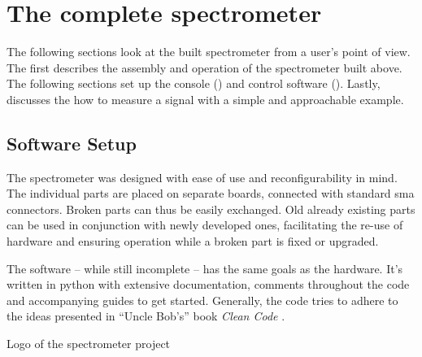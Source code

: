 \chapter{The complete spectrometer}

The following sections look at the built spectrometer from a user's point of view. The first  describes the assembly and operation of the spectrometer built above. The following sections set up the console () and control software (). Lastly,  discusses the how to measure a signal with a simple and approachable example.

\section{Software Setup}
The spectrometer was designed with ease of use and reconfigurability in mind. The individual parts are placed on separate boards, connected with standard \acrshort{sma} connectors. Broken parts can thus be easily exchanged. Old already existing parts can be used in conjunction with newly developed ones, facilitating the re-use of hardware and ensuring operation while a broken part is fixed or upgraded.

The software -- while still incomplete -- has the same goals as the hardware. It's written in \gls{python} with extensive documentation, comments throughout the code and accompanying guides to get started. Generally, the code tries to adhere to the ideas presented in \enquote{Uncle Bob's} book \textit{Clean Code} .

\begin{marginfigure}
    
    \caption{Logo of the \magnethical{} spectrometer project}
\end{marginfigure}

